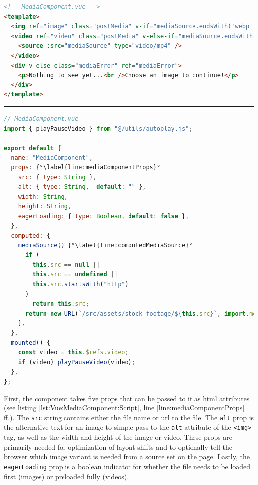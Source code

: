 \documentclass[a4paper, 12pt]{article}
\begin{document}
\vspace{1cm}
\begin{lstlisting}[caption=MediaComponent in Vue.js (Template), label={lst:Vue:MediaComponent:Template}, language=HTML]
<!-- MediaComponent.vue -->
<template>
  <img ref="image" class="postMedia" v-if="mediaSource.endsWith('webp')" :alt="alt" :width="width" :height="height" :loading="eagerLoading ? 'eager' : 'lazy'" :src="mediaSource" />
  <video ref="video" class="postMedia" v-else-if="mediaSource.endsWith('mp4')" :width="width" :preload="eagerLoading ? 'auto' : 'metadata'" controls controlslist="nodownload,nofullscreen,noremoteplayback" disablepictureinpicture loop muted >
    <source :src="mediaSource" type="video/mp4" />
  </video>
  <div v-else class="mediaError" ref="mediaError">
    <p>Nothing to see yet...<br />Choose an image to continue!</p>
  </div>
</template>
\end{lstlisting}
\hrule
\begin{lstlisting}[caption=MediaComponent in Vue.js (Script), label={lst:Vue:MediaComponent:Script}, language=JavaScript, firstnumber=13, escapechar=°]
// MediaComponent.vue
import { playPauseVideo } from "@/utils/autoplay.js";

export default {
  name: "MediaComponent",
  props: {°\label{line:mediaComponentProps}°
    src: { type: String },
    alt: { type: String,  default: "" },
    width: String,
    height: String,
    eagerLoading: { type: Boolean, default: false },
  },
  computed: {
    mediaSource() {°\label{line:computedMediaSource}°
      if (
        this.src == null ||
        this.src == undefined ||
        this.src.startsWith("http")
      )
        return this.src;
      return new URL(`/src/assets/stock-footage/${this.src}`, import.meta.url).href;
    },
  },
  mounted() {
    const video = this.$refs.video;
    if (video) playPauseVideo(video);
  },
};
\end{lstlisting}
\vspace{1cm}

First, the component takes five props that can be passed to it as \acrshort{html} attributes (see listing \ref{lst:Vue:MediaComponent:Script}, line \ref{line:mediaComponentProps} ff.).
The \verb|src| string contains either the file name or \acrshort{url} to the file.
The \verb|alt| prop is the alternative text for an image to simple pass to the \verb|alt| attribute of the \verb|<img>| tag, as well as the width and height of the image or video.
These props are primarily needed for optimization of layout shifts and to optionally tell the browser which image variant is needed from a source set on the page.
Lastly, the \verb|eagerLoading| prop is a boolean indicator for whether the file needs to be loaded first (images) or preloaded fully (videos).
\end{document}
